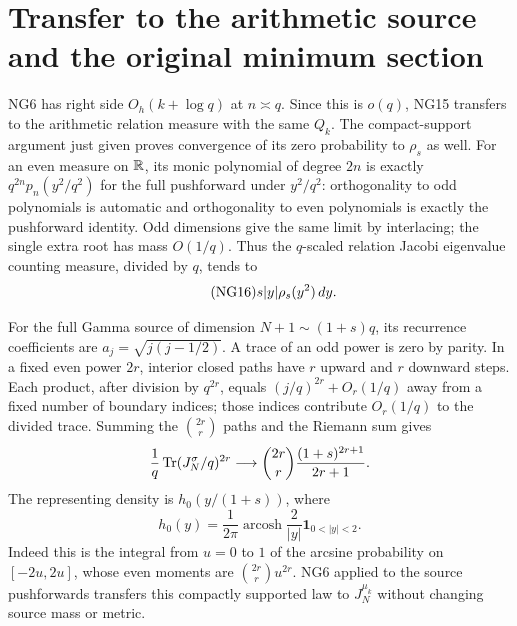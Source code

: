 \section{Transfer to the arithmetic source and the original minimum section}
NG6 has right side $O_h(k+\log q)$ at $n\asymp q$. Since this is
$o(q)$, NG15 transfers to the arithmetic relation measure with the
same $Q_k$. The compact-support argument just given proves convergence
of its zero probability to $\rho_s$ as well. For an even measure on
$\mathbb R$, its monic polynomial of degree $2n$ is exactly
$q^{2n}p_n(y^2/q^2)$ for the full pushforward under $y^2/q^2$:
orthogonality to odd polynomials is automatic and orthogonality to
even polynomials is exactly the pushforward identity. Odd dimensions
give the same limit by interlacing; the single extra root has mass
$O(1/q)$. Thus the $q$-scaled relation Jacobi eigenvalue counting
measure, divided by $q$, tends to
\begin{equation}\tag{NG16}
                         s|y|\rho_s(y^2)\,d y.
\end{equation}

For the full Gamma source of dimension $N+1\sim(1+s)q$, its recurrence
coefficients are $a_j=\sqrt{j(j-1/2)}$. A trace of an odd power is zero
by parity. In a fixed even power $2r$, interior closed paths have $r$
upward and $r$ downward steps. Each product, after division by $q^{2r}$,
equals $(j/q)^{2r}+O_r(1/q)$ away from a fixed number of boundary
indices; those indices contribute $O_r(1/q)$ to the divided trace.
Summing the $\binom{2r}{r}$ paths and the Riemann sum gives
\[
 \frac1q\operatorname{Tr}(J_N^\sigma/q)^{2r}\longrightarrow
 \binom{2r}{r}\frac{(1+s)^{2r+1}}{2r+1}.
\]
The representing density is $h_0(y/(1+s))$, where
\begin{equation}\tag{NG17}
 h_0(y)=\frac1{2\pi}\operatorname{arcosh}\frac2{|y|}
                      \mathbf1_{0<|y|<2}.
\end{equation}
Indeed this is the integral from $u=0$ to $1$ of the arcsine probability
on $[-2u,2u]$, whose even moments are $\binom{2r}{r}u^{2r}$.
NG6 applied to the source pushforwards transfers this compactly
supported law to $J_N^{\mu_k}$ without changing source mass or metric.

